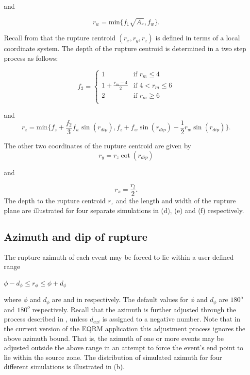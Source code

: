 and

\begin{equation}
r_w = \textrm{min$\{f_1\sqrt{A_r},f_w\}$}.
\end{equation}

Recall from  that the rupture centroid
$(r_x,r_y,r_z)$ is defined in terms of a local coordinate system.
The depth of the rupture centroid is determined in a two step
process as follows:

\begin{equation}
f_2 = \left \{ \begin{array}{ll} 1 & \textrm{if $r_m\leq4$} \\
1 + \frac{r_m-4}{2} & \textrm{if $4<r_m\leq6$} \\
2 & \textrm{if $r_m\geq6$} \\
\end{array} \right.
\end{equation}

and
\begin{equation}
r_z = \textrm{min$\{f_z+\frac{f_2}{3}f_w\sin(r_{dip}),
f_z+f_w\sin(r_{dip})-\frac{1}{2}r_w\sin(r_{dip})\}$}.
\end{equation}

The other two coordinates of the rupture centroid are given by
\begin{equation}
r_y = r_z\cot(r_{dip})
\end{equation}

and

\begin{equation}
r_x = \frac{r_l}{2}.
\end{equation}
The depth to the rupture centroid $r_z$ and the length and width
of the rupture plane are illustrated for four separate simulations
in
(d),
(e) and (f) respectively.



\subsection{Azimuth and dip of rupture}
\label{sec:az-dip-rupture}

The rupture azimuth of each event may be forced to lie within a
user defined range
\begin{center} $\phi - d_{\phi} \leq r_\phi \leq \phi + d_{\phi}$ \end{center}
where $\phi$ and $d_{\phi}$ are  and
 in  respectively. The
default values for $\phi$ and $d_{\phi}$ are $180^o$ and $180^o$
respectively. Recall that the azimuth is further adjusted through
the process described in , unless $d_{azi}$
is assigned to a negative number. Note that in the current version
of the EQRM application this adjustment process ignores the above
azimuth bound. That is, the azimuth of one or more events may be
adjusted outside the above range in an attempt to force the
event's end point to lie within the source zone. The distribution
of simulated azimuth for four different simulations is illustrated
in
(b).

